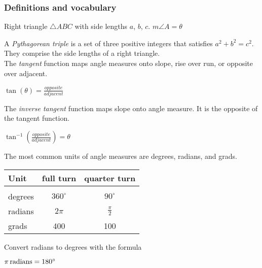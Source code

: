\begin{enumerate}
\newpage
\subsubsection*{Definitions and vocabulary}
Right triangle $\triangle ABC$ with side lengths $a$, $b$, $c$. $m\angle A = \theta$
  \begin{center}
  \end{center}

A \emph{Pythagorean triple} is a set of three positive integers that 
satisfies $a^2+b^2=c^2$. They comprise the side lengths of a right triangle.\\[1cm]
The \emph{tangent} function maps angle measures onto slope, rise over run, or opposite over adjacent.
\begin{center}
$\displaystyle \tan(\theta)=\frac{opposite}{adjacent}$
\end{center}
The \emph{inverse tangent} function maps slope onto angle measure. It is the opposite of the tangent function.
\begin{center}
$\displaystyle \tan^{-1}\left(\frac{opposite}{adjacent}\right)=\theta$
\end{center}
The most common units of angle measures are degrees, radians, and grads.\begin{center}
\begin{tabular}{lcc}
  Unit & full turn & quarter turn\\[0.1cm]
  \hline\\
  degrees & $360^\circ$ & $90^\circ$\\[0.25cm]
  radians & $2\pi$ & $\displaystyle \frac{\pi}{2}$\\[0.35cm]
  grads & 400 & 100
\end{tabular}
\end{center}
Convert radians to degrees with the formula
\begin{center}
 $\pi \, \rm{radians}=180^\circ$
\end{center}

\end{enumerate}

